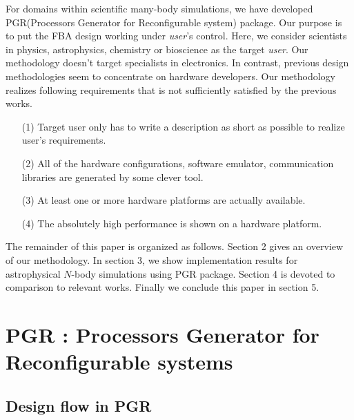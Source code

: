 \documentclass{article}
\begin{document}
For domains within scientific many-body simulations, we have developed
PGR(Processors Generator for Reconfigurable system) package.  Our
purpose is to put the FBA design working under {\it user}'s control.
Here, we consider scientists in physics, astrophysics, chemistry or bioscience as
the target {\it user}. Our methodology doesn't target specialists in
electronics.  In contrast, previous design methodologies seem to
concentrate on hardware developers.  Our methodology realizes
following requirements that is not sufficiently satisfied by the
previous works.

\begin{itemize}
\item[(1)] Target user only has to write a description as short as
possible to realize user's requirements.
\item[(2)] All of the hardware configurations, software emulator,
communication libraries are generated by some clever tool.
\item[(3)] At least one or more hardware platforms are actually available.
\item[(4)] The absolutely high performance is shown on a hardware platform.
\end{itemize}

The remainder of this paper is organized as follows.  Section 2 gives
an overview of our methodology.  In section 3, we show implementation
results for astrophysical $N$-body simulations using PGR package.
Section 4 is devoted to comparison to relevant works.  Finally we
conclude this paper in section 5.


\section{PGR : Processors Generator for Reconfigurable systems}
\label{sec:PGR}

\subsection{Design flow in PGR}
\end{document}
